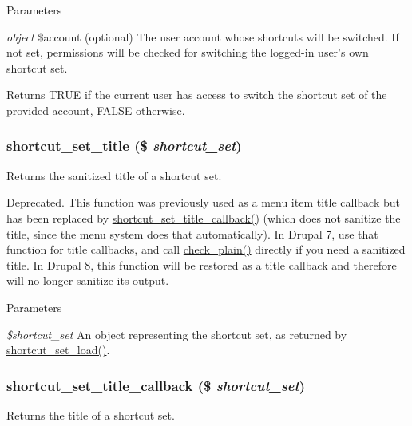 \begin{DoxyParams}{Parameters}
\item[{\em object}]\$account (optional) The user account whose shortcuts will be switched. If not set, permissions will be checked for switching the logged-\/in user's own shortcut set.\end{DoxyParams}
\begin{DoxyReturn}{Returns}
TRUE if the current user has access to switch the shortcut set of the provided account, FALSE otherwise. 
\end{DoxyReturn}
\hypertarget{shortcut_8module_a935b8613a1328fdd3f713c50f368a9bf}{
\subsubsection[{shortcut\_\-set\_\-title}]{\setlength{\rightskip}{0pt plus 5cm}shortcut\_\-set\_\-title (\$ {\em shortcut\_\-set})}}
\label{shortcut_8module_a935b8613a1328fdd3f713c50f368a9bf}
Returns the sanitized title of a shortcut set.

Deprecated. This function was previously used as a menu item title callback but has been replaced by \hyperlink{shortcut_8module_a114025d0a62957dd54875b0d3aa7cd6f}{shortcut\_\-set\_\-title\_\-callback()} (which does not sanitize the title, since the menu system does that automatically). In Drupal 7, use that function for title callbacks, and call \hyperlink{group__sanitization_ga76fc67a30fd8d75ddd80565e6e65a13d}{check\_\-plain()} directly if you need a sanitized title. In Drupal 8, this function will be restored as a title callback and therefore will no longer sanitize its output.


\begin{DoxyParams}{Parameters}
\item[{\em \$shortcut\_\-set}]An object representing the shortcut set, as returned by \hyperlink{shortcut_8module_a66161b6ac12978c1a31bb5c5bf27dc65}{shortcut\_\-set\_\-load()}. \end{DoxyParams}
\hypertarget{shortcut_8module_a114025d0a62957dd54875b0d3aa7cd6f}{
\subsubsection[{shortcut\_\-set\_\-title\_\-callback}]{\setlength{\rightskip}{0pt plus 5cm}shortcut\_\-set\_\-title\_\-callback (\$ {\em shortcut\_\-set})}}
\label{shortcut_8module_a114025d0a62957dd54875b0d3aa7cd6f}
Returns the title of a shortcut set.

